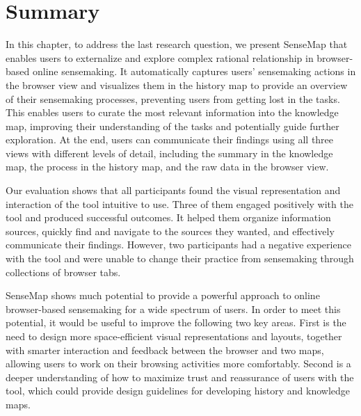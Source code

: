 \section{Summary}
In this chapter, to address the last research question, we present SenseMap that enables users to externalize and explore complex rational relationship in browser-based online sensemaking. It automatically captures users' sensemaking actions in the browser view and visualizes them in the history map to provide an overview of their sensemaking processes, preventing users from getting lost in the tasks. This enables users to curate the most relevant information into the knowledge map, improving their understanding of the tasks and potentially guide further exploration. At the end, users can communicate their findings using all three views with different levels of detail, including the summary in the knowledge map, the process in the history map, and the raw data in the browser view.

Our evaluation shows that all participants found the visual representation and interaction of the tool intuitive to use. Three of them engaged positively with the tool and produced successful outcomes. It helped them organize information sources, quickly find and navigate to the sources they wanted, and effectively communicate their findings. However, two participants had a negative experience with the tool and were unable to change their practice from sensemaking through collections of browser tabs.

SenseMap shows much potential to provide a powerful approach to online browser-based sensemaking for a wide spectrum of users. In order to meet this potential, it would be useful to improve the following two key areas. First is the need to design more space-efficient visual representations and layouts, together with smarter interaction and feedback between the browser and two maps, allowing users to work on their browsing activities more comfortably. Second is a deeper understanding of how to maximize trust and reassurance of users with the tool, which could provide design guidelines for developing history and knowledge maps.